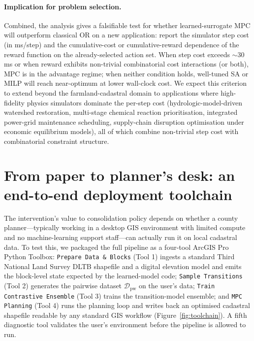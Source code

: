 \documentclass[11pt]{article}
\begin{document}
\paragraph{Implication for problem selection.} Combined, the analysis gives a falsifiable test for whether learned-surrogate MPC will outperform classical OR on a new application: report the simulator step cost (in ms/step) and the cumulative-cost or cumulative-reward dependence of the reward function on the already-selected action set. When step cost exceeds $\sim 30$\,ms or when reward exhibits non-trivial combinatorial cost interactions (or both), MPC is in the advantage regime; when neither condition holds, well-tuned SA or MILP will reach near-optimum at lower wall-clock cost. We expect this criterion to extend beyond the farmland-cadastral domain to applications where high-fidelity physics simulators dominate the per-step cost (hydrologic-model-driven watershed restoration, multi-stage chemical reaction prioritisation, integrated power-grid maintenance scheduling, supply-chain disruption optimisation under economic equilibrium models), all of which combine non-trivial step cost with combinatorial constraint structure.

\section{From paper to planner's desk: an end-to-end deployment toolchain}\label{sec:deploy}

The intervention's value to consolidation policy depends on whether a county planner---typically working in a desktop GIS environment with limited compute and no machine-learning support staff---can actually run it on local cadastral data. To test this, we packaged the full pipeline as a four-tool ArcGIS Pro Python Toolbox: \texttt{Prepare Data \& Blocks} (Tool 1) ingests a standard Third National Land Survey DLTB shapefile and a digital elevation model and emits the block-level state expected by the learned-model code; \texttt{Sample Transitions} (Tool 2) generates the pairwise dataset $\mathcal{D}_{\text{pw}}$ on the user's data; \texttt{Train Contrastive Ensemble} (Tool 3) trains the transition-model ensemble; and \texttt{MPC Planning} (Tool 4) runs the planning loop and writes back an optimised cadastral shapefile readable by any standard GIS workflow (Figure~\ref{fig:toolchain}). A fifth diagnostic tool validates the user's environment before the pipeline is allowed to run.
\end{document}
